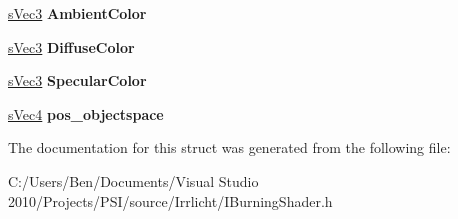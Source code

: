 \begin{DoxyCompactItemize}
\item 
\hypertarget{structirr_1_1video_1_1_s_burning_shader_light_a9ead4d87f01d266f8ebb7993de3ee235}{\hyperlink{structirr_1_1video_1_1s_vec3}{s\-Vec3} {\bfseries Ambient\-Color}}\label{structirr_1_1video_1_1_s_burning_shader_light_a9ead4d87f01d266f8ebb7993de3ee235}

\item 
\hypertarget{structirr_1_1video_1_1_s_burning_shader_light_a3b27451c453be5c2b4aba4b023c965a1}{\hyperlink{structirr_1_1video_1_1s_vec3}{s\-Vec3} {\bfseries Diffuse\-Color}}\label{structirr_1_1video_1_1_s_burning_shader_light_a3b27451c453be5c2b4aba4b023c965a1}

\item 
\hypertarget{structirr_1_1video_1_1_s_burning_shader_light_a815193123a7ebd0d49ba3241121408e5}{\hyperlink{structirr_1_1video_1_1s_vec3}{s\-Vec3} {\bfseries Specular\-Color}}\label{structirr_1_1video_1_1_s_burning_shader_light_a815193123a7ebd0d49ba3241121408e5}

\item 
\hypertarget{structirr_1_1video_1_1_s_burning_shader_light_a94807a761895e75a6d31671a8f581bfd}{\hyperlink{structirr_1_1video_1_1s_vec4}{s\-Vec4} {\bfseries pos\-\_\-objectspace}}\label{structirr_1_1video_1_1_s_burning_shader_light_a94807a761895e75a6d31671a8f581bfd}

\end{DoxyCompactItemize}


The documentation for this struct was generated from the following file\-:\begin{DoxyCompactItemize}
\item 
C\-:/\-Users/\-Ben/\-Documents/\-Visual Studio 2010/\-Projects/\-P\-S\-I/source/\-Irrlicht/I\-Burning\-Shader.\-h\end{DoxyCompactItemize}
